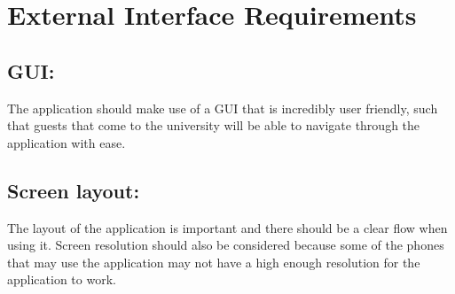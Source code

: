\documentclass[11pt]{article}
\begin{document}
\section{External Interface Requirements}
\subsection{GUI:}
	The application should make use of a GUI that is incredibly user friendly, such that guests that come to the university will be able to navigate through the application with ease.
\subsection{Screen layout:}
	The layout of the application is important and there should be a clear flow when using it. Screen resolution should also be considered because some of the phones that may use the application may not have a high enough resolution for the application to work.
\end{document}
